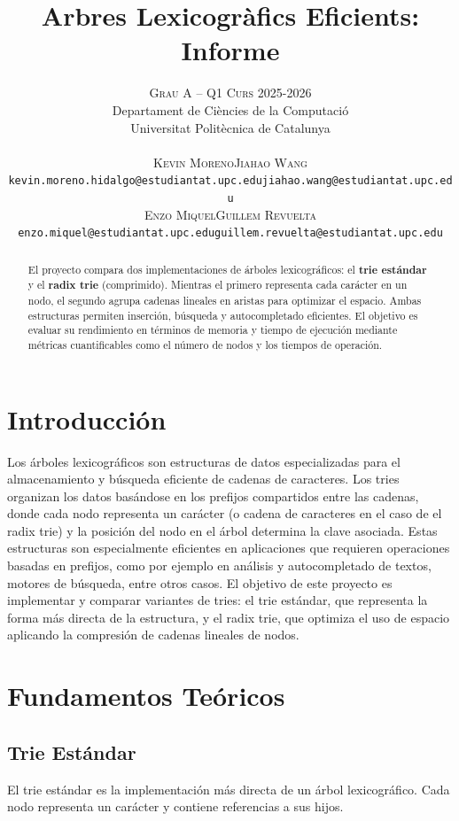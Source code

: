 \documentclass[11pt,a4paper]{article}
\title{\textbf{Arbres Lexicogràfics Eficients: Informe}}
\author{
\large
\textsc{Grau A -- Q1 Curs 2025-2026}\\[2mm] 
\normalsize Departament de Ciències de la Computació \\
\normalsize Universitat Politècnica de Catalunya \\[1cm]
%
\begin{tabular}{cc}
{\textsc{Kevin Moreno}} & {\textsc{Jiahao Wang}} \\
\normalsize \texttt{kevin.moreno.hidalgo@estudiantat.upc.edu} & \normalsize \texttt{jiahao.wang@estudiantat.upc.edu} \\[4mm]
{\textsc{Enzo Miquel}} & {\textsc{Guillem Revuelta}} \\
\normalsize \texttt{enzo.miquel@estudiantat.upc.edu} & \normalsize \texttt{guillem.revuelta@estudiantat.upc.edu} \\
\end{tabular}
}
\date{}
\begin{document}
\maketitle

\begin{abstract}
El proyecto compara dos implementaciones de árboles lexicográficos: el \textbf{trie estándar} y el \textbf{radix trie} (comprimido). Mientras el primero representa cada carácter en un nodo, el segundo agrupa cadenas lineales en aristas para optimizar el espacio. Ambas estructuras permiten inserción, búsqueda y autocompletado eficientes. El objetivo es evaluar su rendimiento en términos de memoria y tiempo de ejecución mediante métricas cuantificables como el número de nodos y los tiempos de operación.
\end{abstract}

\section{Introducción}

Los árboles lexicográficos son estructuras de datos especializadas para el almacenamiento y búsqueda eficiente de cadenas de caracteres. Los tries organizan los datos basándose en los prefijos compartidos entre las cadenas, donde cada nodo representa un carácter (o cadena de caracteres en el caso de el radix trie) y la posición del nodo en el árbol determina la clave asociada. Estas estructuras son especialmente eficientes en aplicaciones que requieren operaciones basadas en prefijos, como por ejemplo en análisis y autocompletado de textos, motores de búsqueda, entre otros casos. El objetivo de este proyecto es implementar y comparar variantes de tries: el trie estándar, que representa la forma más directa de la estructura, y el radix trie, que optimiza el uso de espacio aplicando la compresión de cadenas lineales de nodos.

\section{Fundamentos Teóricos}

\subsection{Trie Estándar}

El trie estándar es la implementación más directa de un árbol lexicográfico. Cada nodo representa un carácter y contiene referencias a sus hijos.
\end{document}

